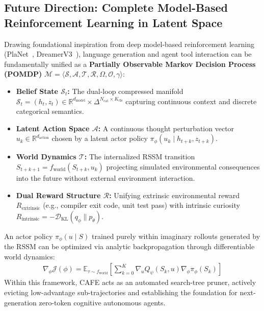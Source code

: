 \subsection{Future Direction: Complete Model-Based Reinforcement Learning in Latent Space}
\label{sec:future_rl}

Drawing foundational inspiration from deep model-based reinforcement learning (PlaNet~\citep{hafner2019planet}, DreamerV3~\citep{hafner2024dreamerv3}), language generation and agent tool interaction can be fundamentally unified as a \textbf{Partially Observable Markov Decision Process (POMDP)} $\mathcal{M} = \langle \mathcal{S}, \mathcal{A}, \mathcal{T}, \mathcal{R}, \Omega, \mathcal{O}, \gamma \rangle$:
\begin{itemize}[leftmargin=*]
    \item \textbf{Belief State $\mathcal{S}_t$:} The dual-loop compressed manifold $\mathcal{S}_t = (h_t, z_t) \in \mathbb{R}^{d_{\text{model}}} \times \Delta^{N_{\text{cat}} \times K_{\text{cls}}}$ capturing continuous context and discrete categorical semantics.
    \item \textbf{Latent Action Space $\mathcal{A}$:} A continuous thought perturbation vector $u_k \in \mathbb{R}^{d_{\text{action}}}$ chosen by a latent actor policy $\pi_\phi(u_k \mid h_{t+k}, z_{t+k})$.
    \item \textbf{World Dynamics $\mathcal{T}$:} The internalized RSSM transition $S_{t+k+1} = f_{\text{world}}(S_{t+k}, u_k)$ projecting simulated environmental consequences into the future without external environment interaction.
    \item \textbf{Dual Reward Structure $\mathcal{R}$:} Unifying extrinsic environmental reward $R_{\text{extrinsic}}$ (e.g., compiler exit code, unit test pass) with intrinsic curiosity $R_{\text{intrinsic}} = -\mathcal{D}_{\mathrm{KL}}(q_\phi \parallel p_\theta)$.
\end{itemize}

An actor policy $\pi_\phi(u \mid S)$ trained purely within imaginary rollouts generated by the RSSM can be optimized via analytic backpropagation through differentiable world dynamics:
\begin{equation}
\begin{split}
    \nabla_\phi \mathcal{J}(\phi) = \mathbb{E}_{\tau \sim f_{\text{world}}} \left[ \sum_{k=0}^K \nabla_u Q_\psi(S_k, u) \nabla_\phi \pi_\phi(S_k) \right]
\end{split}
\end{equation}
Within this framework, CAFE acts as an automated search-tree pruner, actively evicting low-advantage sub-trajectories and establishing the foundation for next-generation zero-token cognitive autonomous agents.
